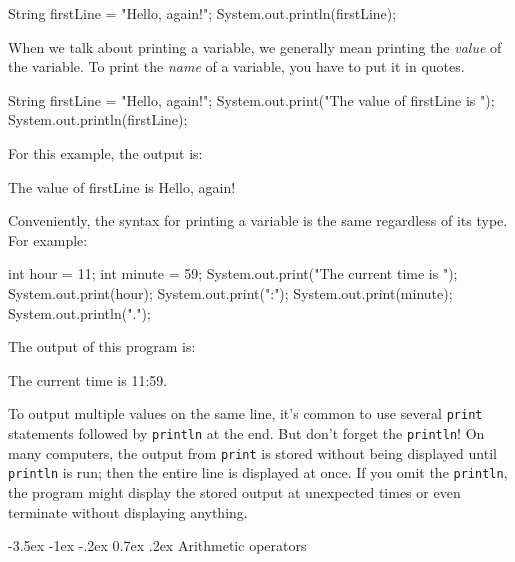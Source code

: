 \documentclass[12pt]{book}
\makeatletter
\theoremstyle{exercise}
\newcommand{\java}[1]{\verb"#1"}
\renewcommand{\section}{\@startsection{section}{1}{\z@}%
    {-3.5ex \@plus -1ex \@minus -.2ex}%
    {0.7ex \@plus.2ex}%
    {\normalfont\Large\bfseries}}
\newcommand{\java}[1]{\lstinline{#1}} %
\makeatother
\begin{document}
\begin{code}
    String firstLine = "Hello, again!";
    System.out.println(firstLine);
\end{code}

%

When we talk about printing a variable, we generally mean printing the {\em value} of the variable.
To print the {\em name} of a variable, you have to put it in quotes.

\begin{code}
    String firstLine = "Hello, again!";
    System.out.print("The value of firstLine is ");
    System.out.println(firstLine);
\end{code}

For this example, the output is:

\begin{stdout}
The value of firstLine is Hello, again!
\end{stdout}

Conveniently, the syntax for printing a variable is the same regardless of its type.
For example:

\begin{code}
    int hour = 11;
    int minute = 59;
    System.out.print("The current time is ");
    System.out.print(hour);
    System.out.print(":");
    System.out.print(minute);
    System.out.println(".");
\end{code}

The output of this program is:

\begin{stdout}
The current time is 11:59.
\end{stdout}

To output multiple values on the same line, it's common to use several \java{print} statements followed by \java{println} at the end.
But don't forget the \java{println}!
On many computers, the output from \java{print} is stored without being displayed until \java{println} is run; then the entire line is displayed at once.
If you omit the \java{println}, the program might display the stored output at unexpected times or even terminate without displaying anything.


\section{Arithmetic operators}
\label{sec:arithops}
\end{document}
